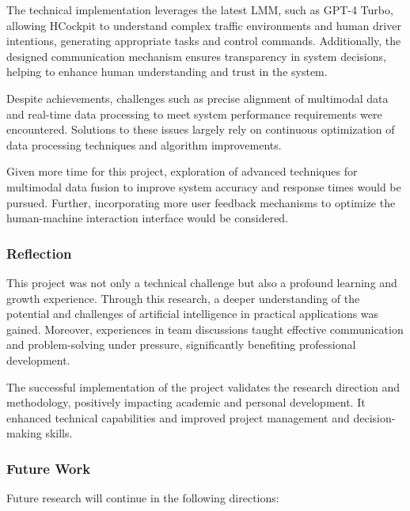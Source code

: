 \documentclass[
]{article}
\begin{document}
The technical implementation leverages the latest LMM, such as GPT-4
Turbo, allowing HCockpit to understand complex traffic environments and
human driver intentions, generating appropriate tasks and control
commands. Additionally, the designed communication mechanism ensures
transparency in system decisions, helping to enhance human understanding
and trust in the system.

Despite achievements, challenges such as precise alignment of multimodal
data and real-time data processing to meet system performance
requirements were encountered. Solutions to these issues largely rely on
continuous optimization of data processing techniques and algorithm
improvements.

Given more time for this project, exploration of advanced techniques for
multimodal data fusion to improve system accuracy and response times
would be pursued. Further, incorporating more user feedback mechanisms
to optimize the human-machine interaction interface would be considered.

\subsubsection{Reflection}\label{reflection}

This project was not only a technical challenge but also a profound
learning and growth experience. Through this research, a deeper
understanding of the potential and challenges of artificial intelligence
in practical applications was gained. Moreover, experiences in team
discussions taught effective communication and problem-solving under
pressure, significantly benefiting professional development.

The successful implementation of the project validates the research
direction and methodology, positively impacting academic and personal
development. It enhanced technical capabilities and improved project
management and decision-making skills.

\subsubsection{Future Work}\label{future-work}

Future research will continue in the following directions:
\end{document}
